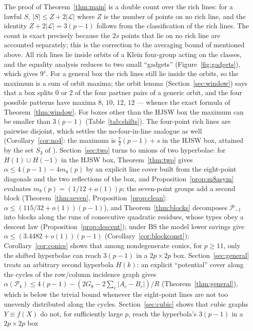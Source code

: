 \documentclass[11pt]{article}
\theoremstyle{remark}
\newcommand{\Lc}{\mathcal{L}}
\newcommand{\Pset}{\mathcal{P}}
\begin{document}
The proof of Theorem~\ref{thm:main} is a double count over the rich lines: for a lawful $S$, $|S|\le Z+2|\Lc|$ where $Z$ is
the number of points on no rich line, and the identity $Z+2|\Lc|=3(p-1)$ follows from the classification of the rich lines.  The count is
exact precisely because the $2s$ points that lie on no rich line are accounted separately; this is the correction to
the averaging bound of \cite{KNS25} mentioned above.  All rich lines lie inside orbits of a Klein four-group acting on
the classes, and the equality analysis reduces to two small ``gadgets'' (Figure~\ref{fig:gadgets}), which gives $9^s$.
For a general box the rich lines still lie inside the orbits, so the maximum is a sum of orbit maxima; the orbit lemma
(Section~\ref{sec:window}) says that a box splits $0$ or $2$ of the four partner pairs of a generic orbit, and the four
possible patterns have maxima $8$, $10$, $12$, $12$ --- whence the exact formula of Theorem~\ref{thm:window}.  For boxes
other than the HJSW box the maximum can be smaller than $3(p-1)$ (Table~\ref{tab:shifts}).
The four-point rich lines are pairwise disjoint, which settles the no-four-in-line analogue as well
(Corollary~\ref{cor:no4}: the maximum is $\tfrac72(p-1)+s$ in the HJSW box, attained by the set $S_3$ of \cite{KNS25}).
Section~\ref{sec:two} turns to unions of two hyperbolae: for $H(1)\cup H(-1)$ in the HJSW box, Theorem~\ref{thm:two} gives
$\alpha\le4(p-1)-4m_8(p)$ by an explicit line cover built from the eight-point diagonals and the two reflections of the box, and
Proposition~\ref{prop:m8asym} evaluates $m_8(p)=(1/12+o(1))p$; the seven-point groups add a second block
(Theorem~\ref{thm:seven}, Proposition~\ref{prop:clean}: $\alpha\le(115/32+o(1))(p-1)$), and Theorem~\ref{thm:blocks} decomposes
$\Pset_{-1}$ into blocks along the runs of consecutive quadratic residues, whose types obey a descent law
(Proposition~\ref{prop:descent}); under BS the model lower savings give $\alpha\le(3.4482+o(1))(p-1)$ (Corollary~\ref{cor:blockconst});
Corollary~\ref{cor:conics} shows that among nondegenerate conics, for $p\ge11$, only the shifted
hyperbolae can reach $3(p-1)$ in a $2p\times2p$ box.  Section~\ref{sec:general} treats an arbitrary second hyperbola $H(k)$: an explicit
``potential'' cover along the cycles of the row/column incidence graph gives $\alpha(\Pset_k)\le4(p-1)-(2G_8-2\sum_c|A_c-B_c|)/R$
(Theorem~\ref{thm:general}), which is below the trivial bound whenever the eight-point lines are not too unevenly distributed along the cycles.
Section~\ref{sec:cubic} shows that cubic graphs $Y\equiv f(X)$ do not, for sufficiently large $p$, reach the hyperbola's $3(p-1)$ in a $2p\times2p$ box
\end{document}
